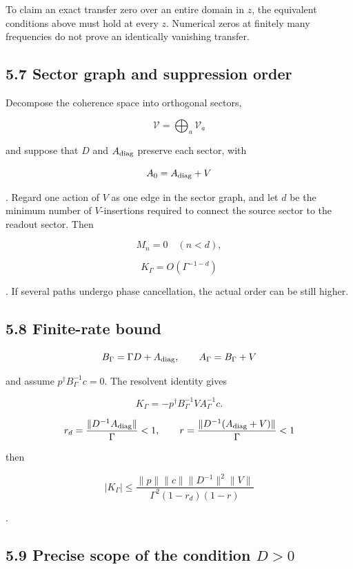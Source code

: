 \documentclass[
  10pt,
  a4paper,
]{article}
\begin{document}
To claim an exact transfer zero over an entire domain in \(z\), the
equivalent conditions above must hold at every \(z\). Numerical zeros at
finitely many frequencies do not prove an identically vanishing
transfer.

\subsection{5.7 Sector graph and suppression
order}\label{sector-graph-and-suppression-order}

Decompose the coherence space into orthogonal sectors,

\[
\mathcal V=\bigoplus_a\mathcal V_a
\]

and suppose that \(D\) and \(A_{\rm diag}\) preserve each sector, with

\[
A_0=A_{\rm diag}+V
\]

. Regard one action of \(V\) as one edge in the sector graph, and let
\(d\) be the minimum number of \(V\)-insertions required to connect the
source sector to the readout sector. Then

\[
M_n=0\quad(n<d),
\]

\[
\boxed{
K_\Gamma=O(\Gamma^{-1-d})
}
\]

. If several paths undergo phase cancellation, the actual order can be
still higher.

\subsection{5.8 Finite-rate bound}\label{finite-rate-bound}

\[
B_\Gamma=\Gamma D+A_{\rm diag},
\qquad
A_\Gamma=B_\Gamma+V
\]

and assume \(p^\dagger B_\Gamma^{-1}c=0\). The resolvent identity gives

\[
K_\Gamma
=-p^\dagger B_\Gamma^{-1}VA_\Gamma^{-1}c.
\]

\[
r_d=\frac{\|D^{-1}A_{\rm diag}\|}{\Gamma}<1,
\qquad
r=\frac{\|D^{-1}(A_{\rm diag}+V)\|}{\Gamma}<1
\]

then

\[
\boxed{
|K_\Gamma|
\le
\frac{\|p\|\|c\|\|D^{-1}\|^2\|V\|}
{\Gamma^2(1-r_d)(1-r)}
}
\]

.

\subsection{\texorpdfstring{5.9 Precise scope of the condition
\(D>0\)}{5.9 Precise scope of the condition D\textgreater0}}\label{precise-scope-of-the-condition-d0}
\end{document}
